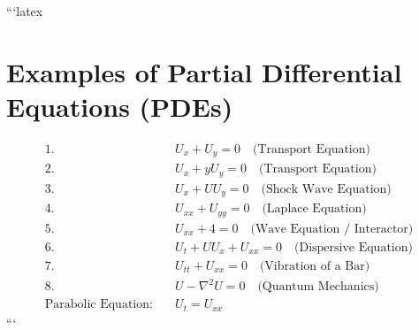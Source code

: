 ```latex
\section*{Examples of Partial Differential Equations (PDEs)}

\begin{align}
    1. \quad & U_x + U_y = 0 \quad \text{(Transport Equation)} \\
    2. \quad & U_x + y U_y = 0 \quad \text{(Transport Equation)} \\
    3. \quad & U_x + U U_y = 0 \quad \text{(Shock Wave Equation)} \\
    4. \quad & U_{xx} + U_{yy} = 0 \quad \text{(Laplace Equation)} \\
    5. \quad & U_{xx} + 4 = 0 \quad \text{(Wave Equation / Interactor)} \\
    6. \quad & U_t + U U_x + U_{xx} = 0 \quad \text{(Dispersive Equation)} \\
    7. \quad & U_{tt} + U_{xx} = 0 \quad \text{(Vibration of a Bar)} \\
    8. \quad & U - \nabla^2 U = 0 \quad \text{(Quantum Mechanics)} \\
    \text{Parabolic Equation:} \quad & U_t = U_{xx}
\end{align}
```
